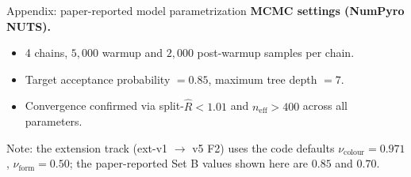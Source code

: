 \documentclass[10pt,aspectratio=169]{beamer}
\newcommand{\main}[1]{\textcolor{CSP-main-dark}{\textbf{#1}}}
\newcommand{\muted}[1]{\textcolor{CSP-text-light}{#1}}
\begin{document}
\begin{frame}{Appendix: paper-reported model parametrization}
\vspace{0.5em}
\main{MCMC settings (NumPyro NUTS).}
\begin{itemize}\itemsep0.1em
  \item 4 chains, $5{,}000$ warmup and $2{,}000$ post-warmup samples per chain.
  \item Target acceptance probability $= 0.85$, maximum tree depth $= 7$.
  \item Convergence confirmed via split-$\hat R < 1.01$ and $n_\text{eff} > 400$ across all parameters.
\end{itemize}

\vspace{0.4em}
\muted{Note: the extension track (ext-v1 $\to$ v5 F2) uses the code defaults $\nu_\text{colour} = 0.971$, $\nu_\text{form} = 0.50$; the paper-reported Set B values shown here are $0.85$ and $0.70$.}
\end{frame}
\end{document}
